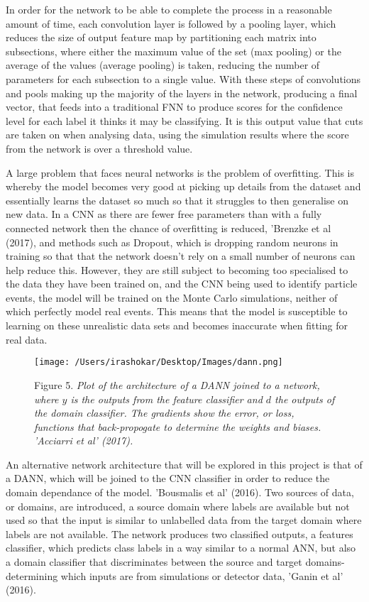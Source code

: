 \documentclass[11pt]{article}
\begin{document}
In order for the network to be able to complete the process in a reasonable amount of time, each convolution layer is followed by a pooling layer, which reduces the size of output feature map by partitioning each matrix into subsections, where either the maximum value of the set (max pooling) or the average of the values (average pooling) is taken, reducing the number of parameters for each subsection to a single value. With these steps of convolutions and pools making up the majority of the layers in the network, producing a final vector, that feeds into a traditional FNN to produce scores for the confidence level for each label it thinks it may be classifying. It is this output value that cuts are taken on when analysing data, using the simulation results where the score from the network is over a threshold value. 
 
A large problem that faces neural networks is the problem of overfitting. This is whereby the model becomes very good at picking up details from the dataset and essentially learns the dataset so much so that it struggles to then generalise on new data. In a CNN as there are fewer free parameters than with a fully connected network then the chance of overfitting is reduced, ’Brenzke et al (2017), and methods such as Dropout, which is dropping random neurons in training so that that the network doesn’t rely on a small number of neurons can help reduce this. 
However, they are still subject to becoming too specialised to the data they have been trained on, and the CNN being used to identify particle events, the model will be trained on the Monte Carlo simulations, neither of which perfectly model real events. This means that the model is susceptible to learning on these unrealistic data sets and becomes inaccurate when fitting for real data. 

\begin{figure}[t]
 \centering
 \texttt{[image: /Users/irashokar/Desktop/Images/dann.png]} 
 
 Figure 5. \textit{Plot of the architecture of a DANN joined to a network, where $y$ is the outputs from the feature classifier and $d$ the  outputs of the domain classifier. The gradients show the error, or loss, functions that back-propogate to determine the weights and biases. 'Acciarri et al' (2017).}
\end{figure}

An alternative network architecture that will be explored in this project is that of a DANN, which will be joined to the CNN classifier in order to reduce the domain dependance of the model. 'Bousmalis et al' (2016). Two sources of data, or domains, are introduced, a source domain where labels are available but not used so that the input is similar to unlabelled data from the target domain where labels are not available. The network produces two classified outputs, a features classifier, which predicts class labels in a way similar to a normal ANN, but also a domain classifier that discriminates between the source and target domains- determining which inputs are from simulations or detector data, 'Ganin et al' (2016).
\end{document}
